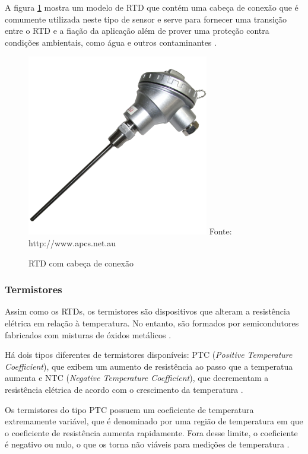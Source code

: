 A figura \ref{figura:rtd} mostra um modelo de RTD que contém uma cabeça de conexão que é comumente utilizada
neste tipo de sensor e serve para fornecer uma transição entre o RTD e a fiação da aplicação além de prover
uma proteção contra condições ambientais, como água e outros contaminantes \cite{burns2014}.
\begin{figure}[H]
	\caption{RTD com cabeça de conexão}
	\centering
	\includegraphics[scale=1.8]{../images/rtd.png}
	\hspace{\linewidth}
	Fonte: http://www.apcs.net.au
	\label{figura:rtd}
\end{figure}

\subsubsection{Termistores}
Assim como os RTDs, os termistores são dispositivos que alteram a resistência elétrica em relação à
temperatura. No entanto, são formados por semicondutores fabricados com misturas de óxidos metálicos
\cite{white_sapoff2014}.

Há dois tipos diferentes de termistores disponíveis: PTC (\textit{Positive Temperature Coefficient}), que
exibem um aumento de resistência ao passo que a temperatua aumenta e NTC (\textit{Negative Temperature
Coefficient}), que decrementam a resistência elétrica de acordo com o crescimento da temperatura
\cite{fontes2005}.

Os termistores do tipo PTC possuem um coeficiente de temperatura extremamente variável, que é denominado por
uma região de temperatura em que o coeficiente de resistência aumenta rapidamente. Fora desse limite, o
coeficiente é negativo ou nulo, o que os torna não viáveis para medições de temperatura
\cite{white_sapoff2014,thomazini_albuquerque2005}.

